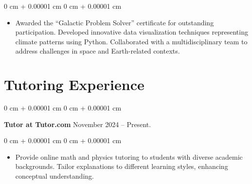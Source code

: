 \documentclass[10pt, letterpaper]{article}
\newenvironment{highlights}{
    \begin{itemize}[
        topsep=0.10 cm,
        parsep=0.10 cm,
        partopsep=0pt,
        itemsep=0pt,
        leftmargin=0 cm + 10pt
    ]
}{
    \end{itemize}
} %
\newenvironment{onecolentry}{
    \begin{adjustwidth}{
        0 cm + 0.00001 cm
    }{
        0 cm + 0.00001 cm
    }
}{
    \end{adjustwidth}
} %
\newenvironment{twocolentry}[2][]{
    \onecolentry
    \def\secondColumn{#2}
    \setcolumnwidth{\fill, 4.5 cm}
    \begin{paracol}{2}
}{
    \switchcolumn \raggedleft \secondColumn
    \end{paracol}
    \endonecolentry
} %
\begin{document}
        \vspace{0.10 cm}
        \begin{onecolentry}
            \begin{highlights}
                \item Awarded the “Galactic Problem Solver” certificate for outstanding participation. Developed innovative data visualization techniques representing climate patterns using Python. Collaborated with a multidisciplinary team to address challenges in space and Earth-related contexts.
            \end{highlights}
        \end{onecolentry}

        \vspace{0.2 cm}

    \section{Tutoring Experience}
        
        \begin{twocolentry}{
            November 2024 -- Present.
        }
            \textbf{Tutor at Tutor.com} \end{twocolentry}

        \vspace{0.10 cm}
        \begin{onecolentry}
            \begin{highlights}
                \item Provide online math and physics tutoring to students with diverse academic backgrounds. Tailor explanations to different learning styles, enhancing conceptual understanding.
            \end{highlights}
        \end{onecolentry}
\end{document}
